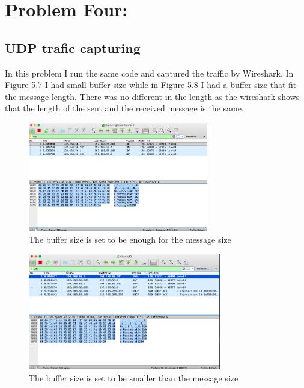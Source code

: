 \documentclass[a4paper,12pt]{article}
\begin{document}
\newpage
\section{Problem Four: }
\subsection{UDP trafic capturing}
In this problem I run the same code and captured the traffic by Wireshark. In Figure 5.7 I had small buffer size while in Figure 5.8 I had a buffer size that fit the message length. There was no different in the length as the wireshark shows that the length of the sent and the received message is the same.

\begin{figure}[h]
    \centering
    \includegraphics[width=0.70\textwidth]{figure6}
    \caption{The buffer size is set to be enough for the message size}
    \label{}
\end{figure}

\begin{figure}[h]
    \centering
    \includegraphics[width=0.75\textwidth]{figure7}
    \caption{The buffer size is set to be smaller than the message size}
    \label{}
\end{figure}

\newpage
\end{document}
